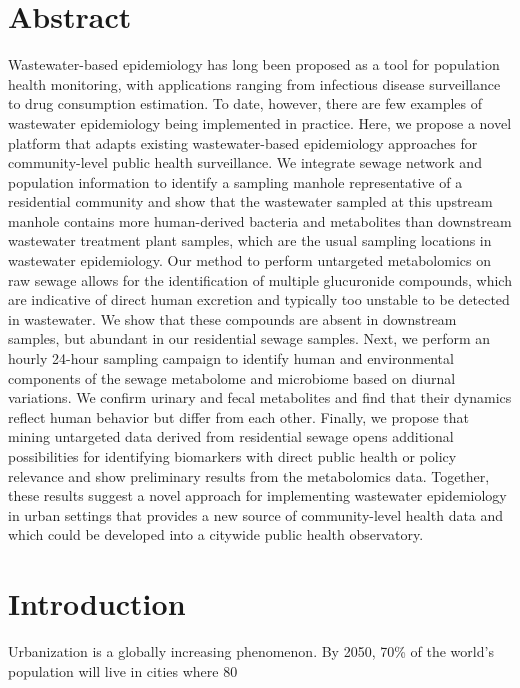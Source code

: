 
\section*{Abstract}

Wastewater-based epidemiology has long been proposed as a tool for population health monitoring, with applications ranging from infectious disease surveillance to drug consumption estimation. To date, however, there are few examples of wastewater epidemiology being implemented in practice. Here, we propose a novel platform that adapts existing wastewater-based epidemiology approaches for community-level public health surveillance. We integrate sewage network and population information to identify a sampling manhole representative of a residential community and show that the wastewater sampled at this upstream manhole contains more human-derived bacteria and metabolites than downstream wastewater treatment plant samples, which are the usual sampling locations in wastewater epidemiology. Our method to perform untargeted metabolomics on raw sewage allows for the identification of multiple glucuronide compounds, which are indicative of direct human excretion and typically too unstable to be detected in wastewater. We show that these compounds are absent in downstream samples, but abundant in our residential sewage samples. Next, we perform an hourly 24-hour sampling campaign to identify human and environmental components of the sewage metabolome and microbiome based on diurnal variations. We confirm urinary and fecal metabolites and find that their dynamics reflect human behavior but differ from each other. Finally, we propose that mining untargeted data derived from residential sewage opens additional possibilities for identifying biomarkers with direct public health or policy relevance and show preliminary results from the metabolomics data. Together, these results suggest a novel approach for implementing wastewater epidemiology in urban settings that provides a new source of community-level health data and which could be developed into a citywide public health observatory.

\section{Introduction}

Urbanization is a globally increasing phenomenon. By 2050, 70\% of the world's population will live in cities where 80%

